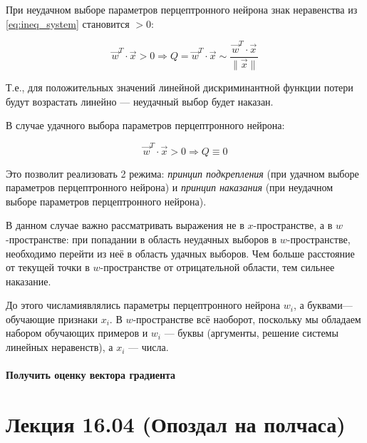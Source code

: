 \documentclass{article}
\numberwithin{equation}{subsection}
\begin{document}
При неудачном выборе параметров перцептронного нейрона знак неравенства 
из \ref{eq:ineq_system} становится $>0$:

\begin{equation}
    \vec{w}^T \cdot \vec{x} >0 \Rightarrow Q = \vec{w}^T \cdot \vec{x} \sim \dfrac{\vec{w}^T \cdot \vec{x}}{\| \vec{x} \|}
\end{equation}

Т.е., для положительных значений линейной дискриминантной функции потери будут
возрастать линейно --- неудачный выбор будет \glqq наказан\grqq.

В случае удачного выбора параметров перцептронного нейрона:

\begin{equation}
    \vec{w}^T \cdot \vec{x} >0 \Rightarrow Q \equiv 0
\end{equation}

Это позволит реализовать 2 режима: \textit{принцип подкрепления} (при удачном
выборе параметров перцептронного нейрона) и \textit{принцип наказания} 
(при неудачном выборе параметров перцептронного нейрона).

В данном случае важно рассматривать выражения не в $x$-пространстве, 
а в $w$-пространстве: при попадании в область неудачных выборов в $w$-пространстве,
необходимо перейти из неё в область удачных выборов. Чем больше расстояние от текущей
точки в $w$-пространстве от отрицательной области, тем сильнее \glqq наказание\grqq.

До этого \glqq числами\grqq являлись параметры перцептронного нейрона $w_i$, а 
\glqq буквами\grqq --- обучающие признаки $x_i$. В $w$-пространстве всё наоборот,
поскольку мы обладаем набором обучающих примеров и $w_i$ --- \glqq буквы\grqq
(аргументы, решение системы линейных неравенств), а $x_i$ --- \glqq числа\grqq.





\paragraph{Получить оценку вектора градиента}


 



\section{Лекция 16.04 (Опоздал на полчаса)}
\end{document}
